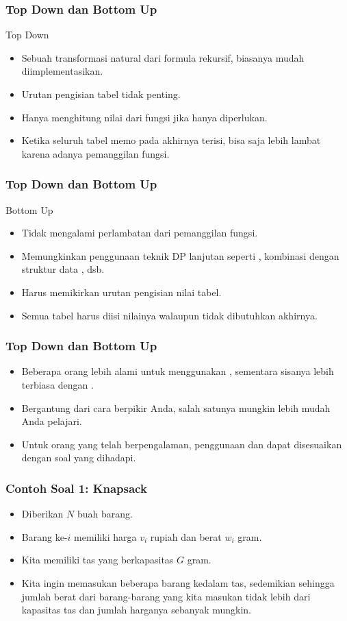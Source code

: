 \begin{frame}
\frametitle{Top Down dan Bottom Up}
Top Down
\begin{itemize}
  \item Sebuah transformasi natural dari formula rekursif, biasanya mudah diimplementasikan.
  \item Urutan pengisian tabel tidak penting.
  \item Hanya menghitung nilai dari fungsi jika hanya diperlukan.
  \item Ketika seluruh tabel memo pada akhirnya terisi, bisa saja lebih lambat karena adanya 
  \foverhead pemanggilan fungsi.
\end{itemize}
\end{frame}

\begin{frame}
\frametitle{Top Down dan Bottom Up}
Bottom Up
\begin{itemize}
  \item Tidak mengalami perlambatan dari \foverhead pemanggilan fungsi.
  \item Memungkinkan penggunaan teknik DP lanjutan seperti , kombinasi dengan struktur data , dsb.
  \item Harus memikirkan urutan pengisian nilai tabel.
  \item Semua tabel harus diisi nilainya walaupun tidak dibutuhkan akhirnya.
\end{itemize}
\end{frame}

\begin{frame}
\frametitle{Top Down dan Bottom Up}
\begin{itemize}
  \item Beberapa orang lebih alami untuk menggunakan \ftopdown, sementara sisanya lebih terbiasa dengan \fbottomup.
  \item Bergantung dari cara berpikir Anda, salah satunya mungkin lebih mudah Anda pelajari.
  \item Untuk orang yang telah berpengalaman, penggunaan \fbottomup dan \ftopdown dapat disesuaikan dengan soal yang dihadapi.
\end{itemize}
\end{frame}

\begin{frame} 
\frametitle{Contoh Soal 1: Knapsack}
\begin{itemize}
  \item Diberikan $N$ buah barang. 
  \item Barang ke-$i$ memiliki harga $v_i$ rupiah dan berat $w_i$ gram. 
  \item Kita memiliki tas yang berkapasitas $G$ gram. 
  \item Kita ingin memasukan beberapa barang kedalam tas, sedemikian sehingga jumlah berat dari barang-barang yang kita masukan tidak lebih dari kapasitas tas dan jumlah harganya sebanyak mungkin.
\end{itemize}
\end{frame}


